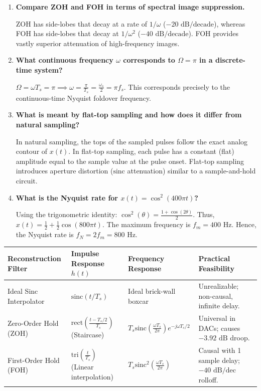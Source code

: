 \documentclass[12pt,a4paper]{article}
\newcommand{\Q}[1]{\textbf{#1}\par\noindent\ignorespaces}
\renewcommand{\arraystretch}{1.45}
\begin{document}
\begin{tcolorbox}[exambox, title={\textbf{Frequently Asked / Viva Questions}}]
\begin{enumerate}[topsep=0pt, label=\textbf{Q\arabic*.}, itemsep=5pt]
  \item \Q{Compare ZOH and FOH in terms of spectral image suppression.}
  ZOH has side-lobes that decay at a rate of $1/\omega$ ($-20\text{ dB/decade}$), whereas FOH has side-lobes that decay at $1/\omega^2$ ($-40\text{ dB/decade}$). FOH provides vastly superior attenuation of high-frequency images.

  \item \Q{What continuous frequency $\omega$ corresponds to $\Omega = \pi$ in a discrete-time system?}
  $\Omega = \omega T_s = \pi \implies \omega = \frac{\pi}{T_s} = \frac{\omega_s}{2} = \pi f_s$. This corresponds precisely to the continuous-time Nyquist foldover frequency.

  \item \Q{What is meant by flat-top sampling and how does it differ from natural sampling?}
  In natural sampling, the tops of the sampled pulses follow the exact analog contour of $x(t)$. In flat-top sampling, each pulse has a constant (flat) amplitude equal to the sample value at the pulse onset. Flat-top sampling introduces aperture distortion ($\text{sinc}$ attenuation) similar to a sample-and-hold circuit.

  \item \Q{What is the Nyquist rate for $x(t) = \cos^2(400\pi t)$?}
  Using the trigonometric identity: $\cos^2(\theta) = \frac{1 + \cos(2\theta)}{2}$. Thus, $x(t) = \frac{1}{2} + \frac{1}{2}\cos(800\pi t)$. The maximum frequency is $f_m = 400\text{ Hz}$. Hence, the Nyquist rate is $f_N = 2 f_m = 800\text{ Hz}$.
\end{enumerate}
\end{tcolorbox}

\begin{tcolorbox}[tikzbox, title={\textbf{Summary Matrix: Comparison of Signal Reconstruction Methods}}]
\par\vspace{4pt}\noindent
\begingroup
\setlength{\tabcolsep}{4.5pt}
\setlength{\extrarowheight}{3pt}
\renewcommand{\arraystretch}{1.35}
\begin{tabularx}{\linewidth}{|B{3.2cm}|B{3.8cm}|B{3.2cm}|Y|}
\hline
\textbf{Reconstruction Filter} & \textbf{Impulse Response $h(t)$} & \textbf{Frequency Response} & \textbf{Practical Feasibility} \\
\hline
Ideal Sinc Interpolator & $\text{sinc}(t / T_s)$ & Ideal brick-wall boxcar & Unrealizable; non-causal, infinite delay. \\
\hline
Zero-Order Hold (ZOH) & $\text{rect}\left(\frac{t - T_s/2}{T_s}\right)$ (Staircase) & $T_s \text{sinc}\left(\frac{\omega T_s}{2\pi}\right) e^{-j\omega T_s/2}$ & Universal in DACs; causes $-3.92\text{ dB}$ droop. \\
\hline
First-Order Hold (FOH) & $\text{tri}\left(\frac{t}{T_s}\right)$ (Linear interpolation) & $T_s \text{sinc}^2\left(\frac{\omega T_s}{2\pi}\right)$ & Causal with 1 sample delay; $-40\text{ dB/dec}$ rolloff. \\
\hline
\end{tabularx}
\endgroup
\end{tcolorbox}
\end{document}

